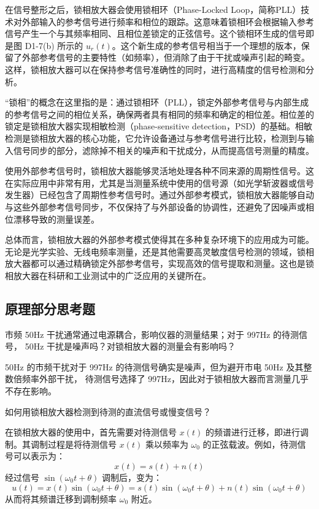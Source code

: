 \documentclass[dvipsnames, svgnames,a4paper,11pt]{article}
\begin{document}
在信号整形之后，锁相放大器会使用锁相环（Phase-Locked Loop，简称PLL）技术对外部输入的参考信号进行频率和相位的跟踪。这意味着锁相环会根据输入参考信号产生一个与其频率相同、且相位差锁定的正弦信号。这个锁相环生成的信号即是图 D1-7(b) 所示的 \( u_r(t) \)。这个新生成的参考信号相当于一个理想的版本，保留了外部参考信号的主要特性（如频率），但消除了由于干扰或噪声引起的畸变。这样，锁相放大器可以在保持参考信号准确性的同时，进行高精度的信号检测和分析。

“锁相”的概念在这里指的是：通过锁相环（PLL），锁定外部参考信号与内部生成的参考信号之间的相位关系，确保两者具有相同的频率和确定的相位差。相位差的锁定是锁相放大器实现相敏检测（phase-sensitive detection，PSD）的基础。相敏检测是锁相放大器的核心功能，它允许设备通过与参考信号进行比较，检测到与输入信号同步的部分，滤除掉不相关的噪声和干扰成分，从而提高信号测量的精度。

使用外部参考信号时，锁相放大器能够灵活地处理各种不同来源的周期性信号。这在实际应用中非常有用，尤其是当测量系统中使用的信号源（如光学斩波器或信号发生器）已经包含了周期性参考信号时。通过外部参考模式，锁相放大器能够自动与这些外部参考信号同步，不仅保持了与外部设备的协调性，还避免了因噪声或相位漂移导致的测量误差。

总体而言，锁相放大器的外部参考模式使得其在多种复杂环境下的应用成为可能。无论是光学实验、无线电频率测量，还是其他需要高灵敏度信号检测的领域，锁相放大器都可以通过精确锁定外部参考信号，实现高效的信号提取和测量。这也是锁相放大器在科研和工业测试中的广泛应用的关键所在。

	\subsection{原理部分思考题}
	
	\begin{question}
		市频 50Hz 干扰通常通过电源耦合，影响仪器的测量结果；对于 997Hz 的待测信号，
50Hz 干扰是噪声吗？对锁相放大器的测量会有影响吗？
	\end{question}
	50Hz 的市频干扰对于 997Hz 的待测信号确实是噪声，但为避开市电 50Hz 及其整数倍频率外部干扰，
待测信号选择了 997Hz，因此对于锁相放大器而言测量几乎不存在影响。
	\begin{question}
		如何用锁相放大器检测到待测的直流信号或慢变信号？
	\end{question}
	在锁相放大器的使用中，首先需要对待测信号 \(x(t)\) 的频谱进行迁移，即进行调制。其调制过程是将待测信号 \(x(t)\) 乘以频率为 \(\omega_0\) 的正弦载波。例如，待测信号可以表示为：
\[
x(t) = s(t) + n(t)
\]
经过信号 \(\sin(\omega_0 t + \theta)\) 调制后，变为：
\[
u(t) = x(t) \sin(\omega_0 t + \theta) = s(t) \sin(\omega_0 t + \theta) + n(t) \sin(\omega_0 t + \theta)
\]
从而将其频谱迁移到调制频率 \(\omega_0\) 附近。
\end{document}
